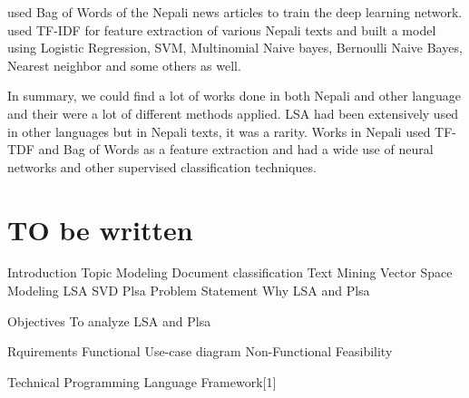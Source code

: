 \documentclass[12pt]{article}
\begin{document}
                        \cite{subba2019nepali} used Bag of Words\cite{salton1983introduction} of the Nepali news articles to train the deep learning network. \cite{singh2018nepali} used TF-IDF for 
                        feature extraction of various Nepali texts and built a model using Logistic Regression, SVM, Multinomial Naive bayes, Bernoulli Naive Bayes, Nearest neighbor and some others as well.

                        In summary, we could find a lot of works done in both Nepali and other language and their were a lot of different methods applied. LSA had been extensively used in 
                        other languages but in Nepali texts, it was a rarity. Works in Nepali used TF-TDF and Bag of Words as a feature extraction and had a wide use of neural networks and other 
                        supervised classification techniques. 



                    

    \section{TO be written}  
    Introduction
        Topic Modeling
        Document classification
        Text Mining
        Vector Space Modeling
        LSA
            SVD
        Plsa
    Problem Statement
        Why LSA and Plsa

    Objectives 
        To analyze LSA and Plsa
    
    Rquirements
    Functional
        Use-case diagram
    Non-Functional
    Feasibility

    Technical 
    Programming Language
    Framework[1]

    
    
\end{document}
